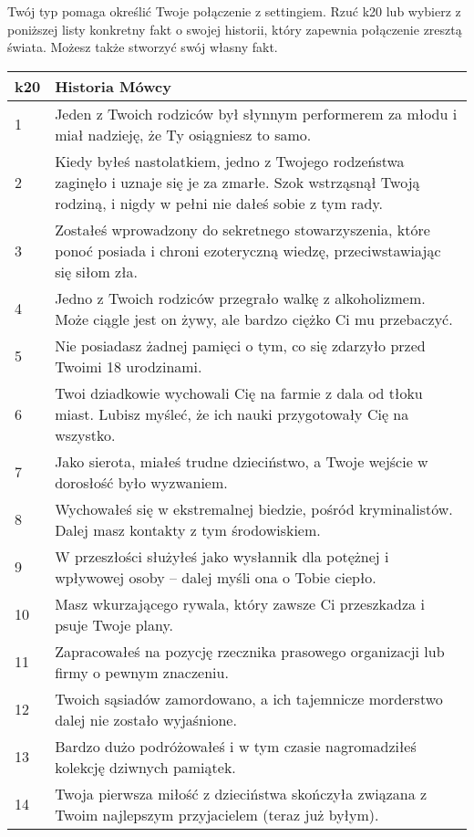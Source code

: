 Twój typ pomaga określić Twoje połączenie z settingiem. Rzuć k20 lub wybierz z poniższej listy konkretny fakt o swojej historii, który zapewnia połączenie zresztą świata. Możesz także stworzyć swój własny fakt.
 \begin{table*}[t]
 \centering
 \begin{tabularx}{\textwidth}{| p{} | X |}
  \hline
    \textbf{k20} & \textbf{Historia Mówcy}  \\ \hline
    1 & Jeden z Twoich rodziców był słynnym performerem za młodu i miał nadzieję, że Ty osiągniesz to samo. \\ \hline
    2 & Kiedy byłeś nastolatkiem, jedno z Twojego rodzeństwa zaginęło i uznaje się je za zmarłe. Szok wstrząsnął Twoją rodziną, i nigdy w pełni nie dałeś sobie z tym rady. \\ \hline
    3 & Zostałeś wprowadzony do sekretnego stowarzyszenia, które ponoć posiada i chroni ezoteryczną wiedzę, przeciwstawiając się siłom zła. \\ \hline
    4 & Jedno z Twoich rodziców przegrało walkę z alkoholizmem. Może ciągle jest on żywy, ale bardzo ciężko Ci mu przebaczyć.  \\ \hline
    5 & Nie posiadasz żadnej pamięci o tym, co się zdarzyło przed Twoimi 18 urodzinami. \\ \hline
    6 & Twoi dziadkowie wychowali Cię na farmie z dala od tłoku miast. Lubisz myśleć, że ich nauki przygotowały Cię na wszystko. \\ \hline
    7 & Jako sierota, miałeś trudne dzieciństwo, a Twoje wejście w dorosłość było wyzwaniem. \\ \hline
    8 & Wychowałeś się w ekstremalnej biedzie, pośród kryminalistów. Dalej masz kontakty z tym środowiskiem. \\ \hline
    9 & W przeszłości służyłeś jako wysłannik dla potężnej i wpływowej osoby – dalej myśli ona o Tobie ciepło. \\ \hline
    10 & Masz wkurzającego rywala, który zawsze Ci przeszkadza i psuje Twoje plany. \\ \hline
    11 & Zapracowałeś na pozycję rzecznika prasowego organizacji lub firmy o pewnym znaczeniu. \\ \hline
    12 & Twoich sąsiadów zamordowano, a ich tajemnicze morderstwo dalej nie zostało wyjaśnione. \\ \hline
    13 & Bardzo dużo podróżowałeś i w tym czasie nagromadziłeś kolekcję  dziwnych pamiątek. \\ \hline
    14 & Twoja pierwsza miłość z dzieciństwa skończyła związana z Twoim najlepszym przyjacielem (teraz już byłym). \\ \hline

\end{tabularx}
\end{table*}
